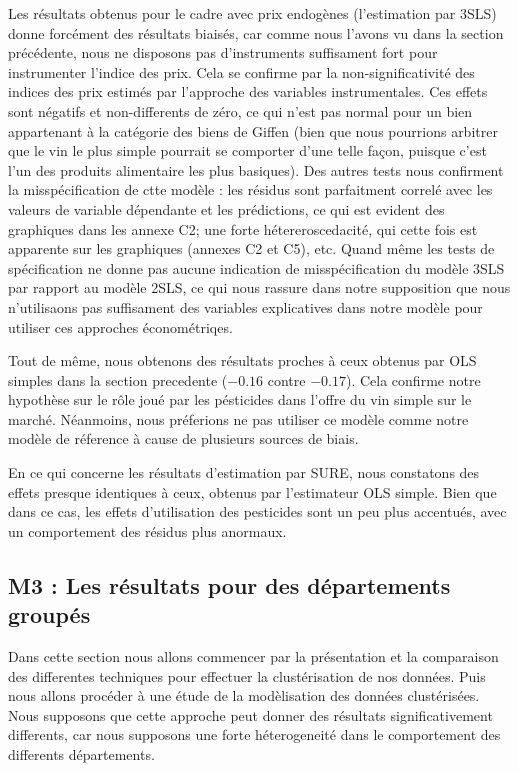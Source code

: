 \documentclass[11pt,]{article}
\begin{document}
Les résultats obtenus pour le cadre avec prix endogènes (l'estimation
par 3SLS) donne forcément des résultats biaisés, car comme nous l'avons
vu dans la section précédente, nous ne disposons pas d'instruments
suffisament fort pour instrumenter l'indice des prix. Cela se confirme
par la non-significativité des indices des prix estimés par l'approche
des variables instrumentales. Ces effets sont négatifs et non-differents
de zéro, ce qui n'est pas normal pour un bien appartenant à la catégorie
des biens de Giffen (bien que nous pourrions arbitrer que le vin le plus
simple pourrait se comporter d'une telle façon, puisque c'est l'un des
produits alimentaire les plus basiques). Des autres tests nous
confirment la misspécification de ctte modèle : les résidus sont
parfaitment correlé avec les valeurs de variable dépendante et les
prédictions, ce qui est evident des graphiques dans les annexe C2; une
forte hétereroscedacité, qui cette fois est apparente sur les graphiques
(annexes C2 et C5), etc. Quand même les tests de spécification ne donne
pas aucune indication de misspécification du modèle 3SLS par rapport au
modèle 2SLS, ce qui nous rassure dans notre supposition que nous
n'utilisaons pas suffisament des variables explicatives dans notre
modèle pour utiliser ces approches économétriqes.

Tout de même, nous obtenons des résultats proches à ceux obtenus par OLS
simples dans la section precedente (\(-0.16\) contre \(-0.17\)). Cela
confirme notre hypothèse sur le rôle joué par les pésticides dans
l'offre du vin simple sur le marché. Néanmoins, nous préferions ne pas
utiliser ce modèle comme notre modèle de réference à cause de plusieurs
sources de biais.

En ce qui concerne les résultats d'estimation par SURE, nous constatons
des effets presque identiques à ceux, obtenus par l'estimateur OLS
simple. Bien que dans ce cas, les effets d'utilisation des pesticides
sont un peu plus accentués, avec un comportement des résidus plus
anormaux.

\hypertarget{m3-les-resultats-pour-des-departements-groupes}{%
\subsection{M3 : Les résultats pour des départements
groupés}\label{m3-les-resultats-pour-des-departements-groupes}}

Dans cette section nous allons commencer par la présentation et la
comparaison des differentes techniques pour effectuer la clustérisation
de nos données. Puis nous allons procéder à une étude de la modèlisation
des données clustérisées. Nous supposons que cette approche peut donner
des résultats significativement differents, car nous supposons une forte
héterogeneité dans le comportement des differents départements.
\end{document}
